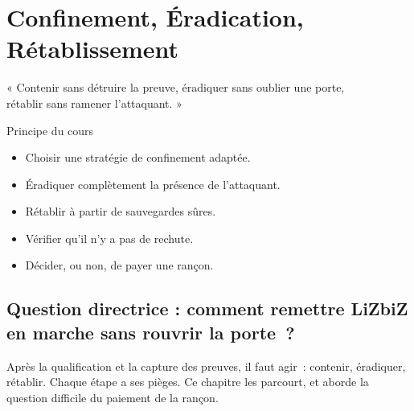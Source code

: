 
\chapter{Confinement, Éradication, Rétablissement}
\label{chap:confinement}

\epigraph{%
    « Contenir sans détruire la preuve, éradiquer sans oublier une porte,\\
    rétablir sans ramener l'attaquant. »%
}{Principe du cours}


\begin{boxobjectifs}
\begin{itemize}
    \item Choisir une stratégie de confinement adaptée.
    \item Éradiquer complètement la présence de l'attaquant.
    \item Rétablir à partir de sauvegardes sûres.
    \item Vérifier qu'il n'y a pas de rechute.
    \item Décider, ou non, de payer une rançon.
\end{itemize}
\end{boxobjectifs}

\bigskip

\section*{Question directrice : comment remettre LiZbiZ en marche sans rouvrir la porte~?}

Après la qualification et la capture des preuves, il faut agir~: contenir,
éradiquer, rétablir. Chaque étape a ses pièges. Ce chapitre les parcourt, et
aborde la question difficile du paiement de la rançon.

